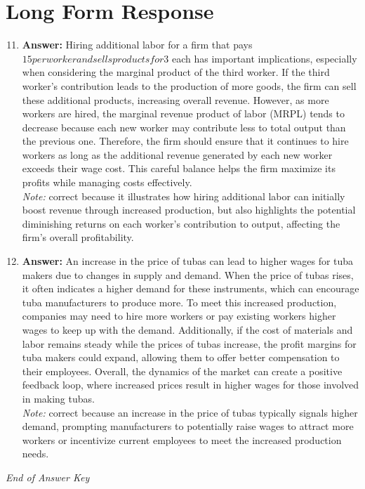 \documentclass[12pt]{article}
\begin{document}
\section*{Long Form Response}
\begin{enumerate}[label=\arabic*.]
\setcounter{enumi}{10}
\item \textbf{Answer:} Hiring additional labor for a firm that pays $15 per worker and sells products for $3 each has important implications, especially when considering the marginal product of the third worker. If the third worker's contribution leads to the production of more goods, the firm can sell these additional products, increasing overall revenue. However, as more workers are hired, the marginal revenue product of labor (MRPL) tends to decrease because each new worker may contribute less to total output than the previous one. Therefore, the firm should ensure that it continues to hire workers as long as the additional revenue generated by each new worker exceeds their wage cost. This careful balance helps the firm maximize its profits while managing costs effectively.
\\ \textit{Note:} correct because it illustrates how hiring additional labor can initially boost revenue through increased production, but also highlights the potential diminishing returns on each worker's contribution to output, affecting the firm's overall profitability.
\item \textbf{Answer:} An increase in the price of tubas can lead to higher wages for tuba makers due to changes in supply and demand. When the price of tubas rises, it often indicates a higher demand for these instruments, which can encourage tuba manufacturers to produce more. To meet this increased production, companies may need to hire more workers or pay existing workers higher wages to keep up with the demand. Additionally, if the cost of materials and labor remains steady while the prices of tubas increase, the profit margins for tuba makers could expand, allowing them to offer better compensation to their employees. Overall, the dynamics of the market can create a positive feedback loop, where increased prices result in higher wages for those involved in making tubas.
\\ \textit{Note:} correct because an increase in the price of tubas typically signals higher demand, prompting manufacturers to potentially raise wages to attract more workers or incentivize current employees to meet the increased production needs.
\end{enumerate}

\vfill
\noindent\textit{End of Answer Key}
\end{document}
